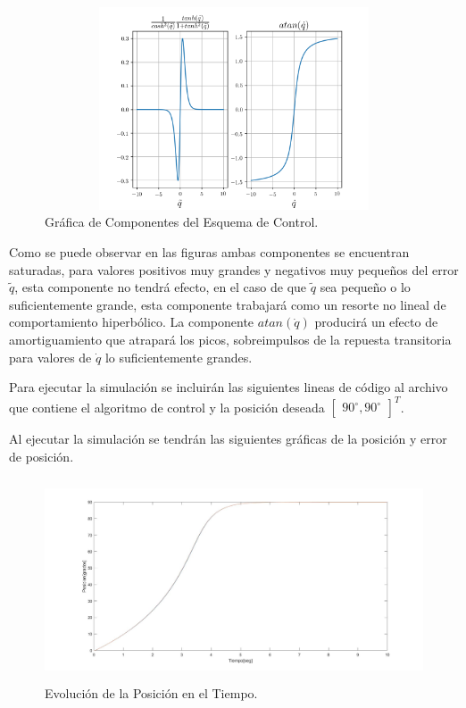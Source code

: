 \documentclass[12pt]{article}
\begin{document}
\begin{enumerate}
    \vspace{15mm}

    \begin{figure}[h]
        \centering
        \includegraphics[width=14cm, height=6cm]{IMAGENES/comportamiento.png}
        \caption{Gráfica de Componentes del Esquema de Control.}
        \label{fig:comportamiento}
    \end{figure}
    
    Como se puede observar en las figuras ambas componentes se encuentran saturadas, para valores positivos muy grandes y negativos muy pequeños del error $\tilde{q}$, esta componente no tendrá efecto, en el caso de que $\tilde{q}$ sea pequeño o lo suficientemente grande, esta componente trabajará como un resorte no lineal de comportamiento hiperbólico. La componente $atan(\dot{q})$ producirá un efecto de amortiguamiento que atrapará los picos, sobreimpulsos de la repuesta transitoria para valores de $\dot{q}$ lo suficientemente grandes. 

    Para ejecutar la simulación se incluirán las siguientes lineas de código al archivo que contiene el algoritmo de control y la posición deseada $\begin{bmatrix}
        90^\circ,90^\circ
    \end{bmatrix}^T$.
    
    Al ejecutar la simulación se tendrán las siguientes gráficas de la posición y error de posición.
    \begin{figure}[h]
        \centering
        \includegraphics[width=14cm, height=6cm]{IMAGENES/pos.jpg}
        \caption{Evolución de la Posición en el Tiempo.}
        \label{fig:position}
    \end{figure}


\end{enumerate}
\end{document}
